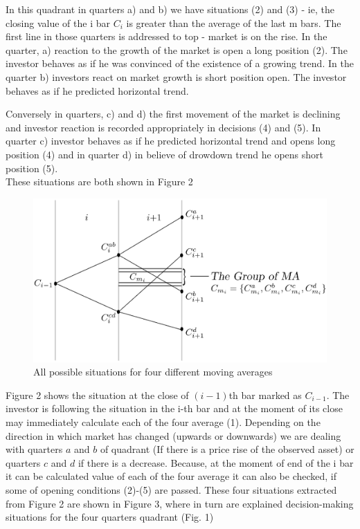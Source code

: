 \documentclass{tewiart}
\begin{document}
In this quadrant in quarters a) and b) we have situations (2) and (3) - ie, the closing value of the i bar $C_i$ is greater than the average of the last m bars. The first line in those quarters is addressed to top - market is on the rise. In the quarter, a) reaction to the growth of the market is open a long position (2). The investor behaves as if he was convinced of the existence of a growing trend. In the quarter b) investors react on market growth is short position open. The investor behaves as if he predicted horizontal trend.

Conversely in quarters, c) and d) the first movement of the market is declining and investor reaction is recorded appropriately in decisions (4) and (5). In quarter c) investor behaves as if he predicted horizontal trend and opens long position (4) and in quarter d) in believe of drowdown trend he opens short position (5). \\
These situations are both shown in Figure 2\\
\begin{figure}[h]
\centering
\centering 
\includegraphics[width=\textwidth]{rysunek1pp.eps}
\caption{All possible situations for four different moving averages}
\end{figure}
\FloatBarrier
\indent Figure 2 shows the situation at the close of $(i-1)$th bar marked as $C_{i-1}$. The investor is following the situation in the i-th bar and at the moment of its close may immediately calculate each of the four average (1). Depending on the direction in which market has changed (upwards or downwards) we are dealing with quarters $a$ and $b$ of quadrant (If there is a price rise of the observed asset) or quarters $c$ and $d$ if there is a decrease.
Because, at the moment of end of the i bar it can be calculated  value of each of the four average it can also be checked, if some of opening conditions (2)-(5) are passed. These four situations extracted from Figure 2 are shown in Figure 3, where in turn are explained  decision-making situations for the four quarters quadrant (Fig. 1)\\
\end{document}
